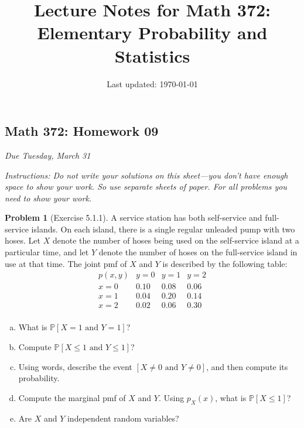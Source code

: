 \documentclass[10pt]{article}
\title{Lecture Notes for Math 372: \\Elementary Probability and Statistics}
\date{Last updated: \today}
\theoremstyle{definition}
\newtheorem{problem}[theorem]{Problem}
\newcommand{\1}[1]{\textbf{1}_{\left[#1\right]}} %
\def\P{\mathbb{P}} %
\begin{document}
\begin{center}
  \section*{Math 372: Homework 09}
  \textit{Due Tuesday, March 31}
\end{center}

\textit{Instructions: Do not write your solutions on this sheet---you don't
  have enough space to show your work. So use separate sheets of paper. For
  all problems you need to show your work.}



\begin{problem}[Exercise 5.1.1]
  A service station has both self-service and full-service
  islands. On each island, there is a single regular unleaded
  pump with two hoses. Let $X$ denote the number of hoses
  being used on the self-service island at a particular time,
  and let $Y$ denote the number of hoses on the full-service
  island in use at that time. The joint pmf of $X$ and $Y$ is described by the
  following table:
  \begin{equation*}
    \begin{array}{c|ccc}
      p(x,y) & y=0 & y=1 & y=2 \\ \hline
      x=0 & 0.10 & 0.08 & 0.06 \\
      x=1 & 0.04 & 0.20 & 0.14 \\
      x=2 & 0.02 & 0.06 & 0.30 \\
    \end{array}
  \end{equation*}
  \begin{enumerate}[(a)]
    \item What is $\P\left[X = 1\text{ and }Y = 1\right]$? 
    \item Compute $\P\left[ X \leq 1 \text{ and } Y \leq 1\right]$?
    \item Using words, describe the event $\left[ X\neq 0 \text{ and } Y\neq 0
    \right]$, and then compute its probability.
    \item Compute the marginal pmf of $X$ and $Y$. Using $p_{X}(x)$, what is
    $\P\left[X \leq 1\right]$?
    \item Are $X$ and $Y$ independent random variables?
  \end{enumerate}
\end{problem}
\end{document}
